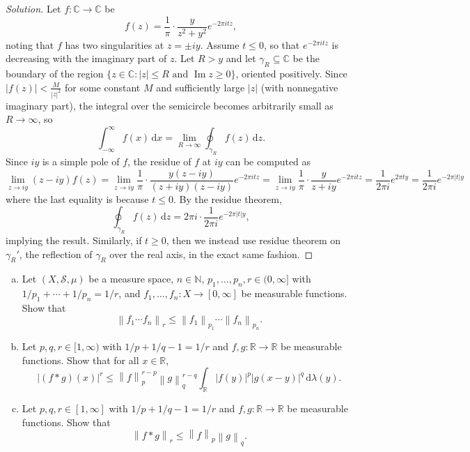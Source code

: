 \documentclass[10pt]{article}
\newcommand{\dd}{\,\mathrm{d}}
\providecommand{\CC}{\mathbb C}
\providecommand{\NN}{\mathbb N}
\providecommand{\RR}{\mathbb R}
\providecommand{\ii}{\item}
\newenvironment{soln}{\begin{proof}[Solution]}{\end{proof}}
\providecommand{\abs}[1]{\left\lvert #1\right\rvert}
\providecommand{\norm}[1]{\left\| #1\right\|}
\begin{document}
\begin{soln}
    Let $f\colon\CC\to\CC$ be
    \begin{equation*}
	f(z) = \frac 1\pi\cdot\frac{y}{z^2 + y^2} e^{-2\pi itz},
    \end{equation*}
    noting that $f$ has two singularities at $z = \pm iy$.
    Assume $t \le 0$, so that $e^{-2\pi itz}$ is decreasing with
    the imaginary part of $z$.
    Let $R > y$ and let $\gamma_R\subseteq\CC$ be the boundary of the region
    $\{z\in\CC : \abs{z}\le R\text{ and } \operatorname{Im}z \ge 0\}$,
    oriented positively. Since $\abs{f(z)} < \frac M{\abs{z}^2}$
    for some constant $M$ and sufficiently large $\abs z$
    (with nonnegative imaginary part),
    the integral over the semicircle becomes arbitrarily small
    as $R\to\infty$, so
    \begin{equation*}
	\int_{-\infty}^\infty f(x)\dd x =
	\lim_{R\to\infty} \oint_{\gamma_R} f(z)\dd z.
    \end{equation*}
    Since $iy$ is a simple pole of $f$,
    the residue of $f$ at $iy$ can be computed as
    \begin{equation*}
	\lim_{z\to iy} (z-iy)f(z)
	= \lim_{z\to iy}\frac 1\pi\cdot\frac{y(z-iy)}{(z+iy)(z-iy)} e^{-2\pi itz}
	= \lim_{z\to iy}\frac 1\pi \cdot\frac{y}{z+iy} e^{-2\pi itz}
	= \frac 1{2\pi i}e^{2\pi ty}
	= \frac 1{2\pi i}e^{-2\pi\abs ty}
    \end{equation*}
    where the last equality is because $t\le 0$.
    By the residue theorem,
    \begin{equation*}
	\oint_{\gamma_R} f(z)\dd z = 2\pi i\cdot \frac 1{2\pi i}e^{-2\pi \abs ty},
    \end{equation*}
    implying the result. Similarly, if $t\ge 0$,
    then we instead use residue theorem on $\gamma_R'$,
    the reflection of $\gamma_R$ over the real axis, in the exact same fashion.
\end{soln}

\begin{problem}
    \begin{enumerate}[(a)]
        \ii Let $(X,\mathcal S,\mu)$ be a measure space, $n\in\NN$,
	$p_1,\dots,p_n,r\in(0,\infty]$ with $1/p_1 + \cdots+ 1/p_n = 1/r$,
	and $f_1,\dots,f_n\colon X\to[0,\infty]$ be measurable functions. Show that
	\begin{equation*}
	    \norm{f_1\cdots f_n}_r \le \norm{f_1}_{p_1}\cdots\norm{f_n}_{p_n}.
	\end{equation*}
	\ii Let $p,q,r\in[1,\infty)$ with $1/p + 1/q - 1 = 1/r$
	and $f,g\colon\RR\to\RR$ be measurable functions.
	Show that for all $x\in\RR$,
	\begin{equation*}
	    \abs{(f*g)(x)}^r \le
	    \norm{f}_p^{r-p}\norm{g}_q^{r-q}
	    \int_\RR\abs{f(y)}^p\abs{g(x-y)}^q\dd\lambda(y).
	\end{equation*}
	\ii Let $p,q,r\in[1,\infty]$ with $1/p + 1/q - 1 = 1/r$ and
	$f,g\colon\RR\to\RR$ be measurable functions. Show that
	\begin{equation*}
	    \norm{f*g}_r \le \norm{f}_p\norm{g}_q.
	\end{equation*}
    \end{enumerate}
\end{problem}
\end{document}
